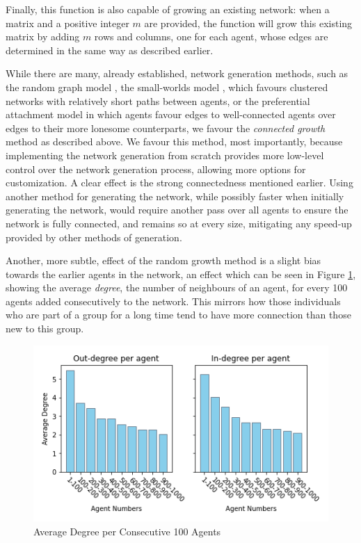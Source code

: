 \documentclass[a4paper, 12pt]{report}
\begin{document}
Finally, this function is also capable of growing an existing network: when a matrix and a positive integer $m$ are provided, the function will grow this existing matrix by adding $m$ rows and columns, one for each agent, whose edges are determined in the same way as described earlier.

While there are many, already established, network generation methods, such as the random graph model \parencite{erdos1959random}, the small-worlds model \parencite{watts1998smallworlds}, which favours clustered networks with relatively short paths between agents, or the preferential attachment model \parencite{barabasi1999pref} in which agents favour edges to well-connected agents over edges to their more lonesome counterparts, we favour the \emph{connected growth} method as described above. We favour this method, most importantly, because implementing the network generation from scratch provides more low-level control over the network generation process, allowing more options for customization. A clear effect is the strong connectedness mentioned earlier. Using another method for generating the network, while possibly faster when initially generating the network, would require another pass over all agents to ensure the network is fully connected, and remains so at every size, mitigating any speed-up provided by other methods of generation. 

Another, more subtle, effect of the random growth method is a slight bias towards the earlier agents in the network, an effect which can be seen in Figure \ref{degree:agent}, showing the average \emph{degree}, the number of neighbours of an agent, for every 100 agents added consecutively to the network. This mirrors how those individuals who are part of a group for a long time tend to have more connection than those new to this group.

\begin{center}
    \begin{figure}[!htbp]
        \centering
        \includegraphics[width=.8\textwidth]{ThesisKI/Images/DirectedStandardPerAgent_cropped.png}
        \caption{Average Degree per Consecutive 100 Agents}
        \label{degree:agent}
    \end{figure}
\end{center}
\end{document}
